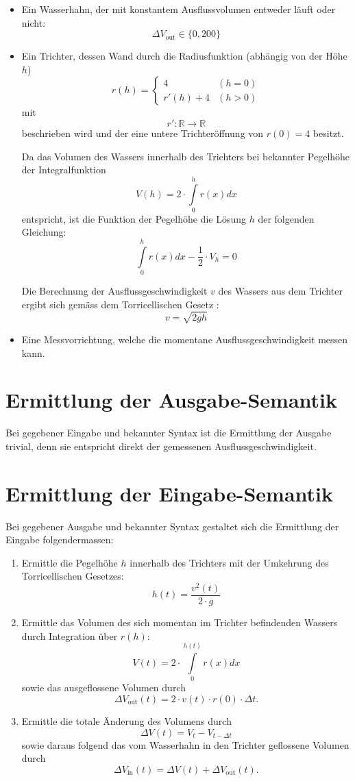 \documentclass[11pt]{scrreprt} %
\theoremstyle{definition}
\begin{document}
\begin{itemize}
\item Ein Wasserhahn, der mit konstantem Ausflussvolumen entweder läuft oder nicht:
\[
	\Delta V_{\text{out}} \in \{ 0, 200 \}
\]
\item Ein Trichter, dessen Wand durch die Radiusfunktion (abhängig von der Höhe $h$)
\[
	r(h) = \begin{cases}
		4 & (h = 0) \\
		r'(h) + 4 & (h > 0)
	\end{cases}
\]
mit 
\[
	r' : \mathbb{R} \rightarrow \mathbb{R}
\]
beschrieben wird und der eine untere Trichteröffnung von $r(0) = 4$ besitzt.

Da das Volumen des Wassers innerhalb des Trichters bei bekannter Pegelhöhe der Integralfunktion
\[
V(h) = 2\cdot \int\limits_{0}^{h} r(x) dx
\]
entspricht, ist die Funktion der Pegelhöhe die Lösung $h$ der folgenden Gleichung:
\[
\int\limits_{0}^{h} r(x) dx - \frac 1 2 \cdot V_h = 0
\]

Die Berechnung der Ausflussgeschwindigkeit $v$ des Wassers aus dem Trichter ergibt sich gemäss dem Torricellischen Gesetz \cite{wiki:ausflussgeschwindigkeit}:
\[
v = \sqrt{2gh}
\]

\item Eine Messvorrichtung, welche die momentane Ausflussgeschwindigkeit messen kann.

\end{itemize}

\section{Ermittlung der Ausgabe-Semantik}

Bei gegebener Eingabe und bekannter Syntax ist die Ermittlung der Ausgabe trivial, denn sie entspricht direkt der gemessenen Ausflussgeschwindigkeit.

\section{Ermittlung der Eingabe-Semantik}

Bei gegebener Ausgabe und bekannter Syntax gestaltet sich die Ermittlung der Eingabe folgendermassen:

\begin{enumerate}
\item Ermittle die Pegelhöhe $h$ innerhalb des Trichters mit der Umkehrung des Torricellischen Gesetzes:
\[
	h(t) = \frac {v^2(t)}{2\cdot g}
\]
\item Ermittle das Volumen des sich momentan im Trichter befindenden Wassers durch Integration über $r(h)$:
\[
	V(t) = 2\cdot \int\limits_0^{h(t)} r(x) dx
\]
sowie das ausgeflossene Volumen durch
\[
	\Delta V_\text{out}(t) = 2\cdot v(t) \cdot r(0) \cdot \Delta t.
\]
\item Ermittle die totale Änderung des Volumens durch
\[
	\Delta V(t) = V_t - V_{t-\Delta t}
\]
sowie daraus folgend das vom Wasserhahn in den Trichter geflossene Volumen durch
\[
	\Delta V_\text{in}(t) = \Delta V(t) + \Delta V_\text{out}(t).
\]
\end{enumerate}
\end{document}
